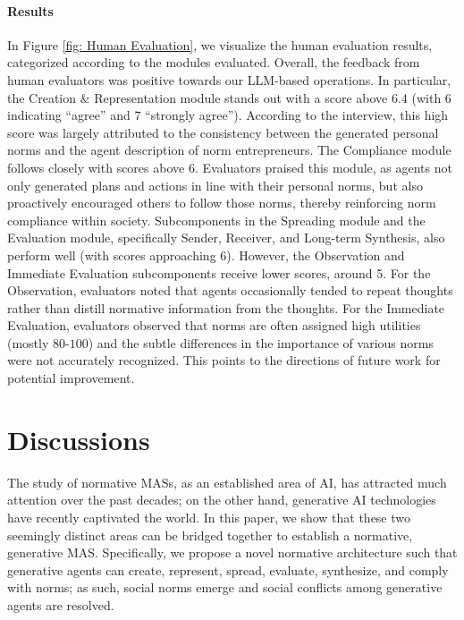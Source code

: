\documentclass{article}
\begin{document}
\paragraph{Results}
In Figure \ref{fig: Human Evaluation}, we visualize the human evaluation results, categorized according to the modules evaluated. Overall, the feedback from human evaluators was positive towards our LLM-based operations. 
In particular, the Creation \& Representation module stands out with a score above $6.4$ (with $6$ indicating ``agree'' and $7$ ``strongly agree'').
According to the interview, this high score was largely attributed to the consistency between the generated personal norms and the agent description of norm entrepreneurs.
The Compliance module follows closely with scores above $6$. 
Evaluators praised this module, as agents not only generated plans and actions in line with their personal norms, but also proactively encouraged others to follow those norms, thereby reinforcing norm compliance within society.
Subcomponents in the Spreading module and the Evaluation module, specifically Sender, Receiver, and Long-term Synthesis, also perform well (with scores approaching $6$). However, the Observation and Immediate Evaluation subcomponents receive lower scores, around 5. 
For the Observation, evaluators noted that agents occasionally tended to repeat thoughts rather than distill normative information from the thoughts. 
For the Immediate Evaluation,  evaluators observed that norms are often assigned high utilities (mostly $80$-$100$) and the subtle differences in the importance of various norms were not accurately recognized.
This points to the directions of future work for potential improvement.

\vspace{-0.1cm}
\section{Discussions} 
The study of normative MASs, as an established area of AI, has attracted much attention over the past decades; on the other hand, generative AI technologies have recently captivated the world. 
In this paper, we show that these two seemingly distinct areas can be bridged together to establish a normative, generative MAS.
Specifically, we propose 
a novel normative architecture such that generative agents can create, represent, spread, evaluate, synthesize, and comply with norms; as such, social norms emerge and social conflicts among generative agents are resolved.
\end{document}
